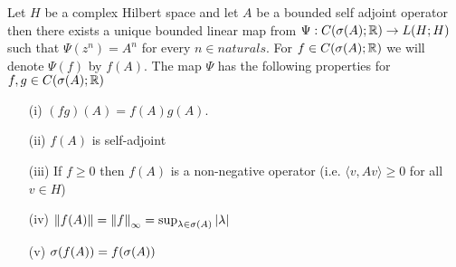 \begin{thm}\label{hilbert:ContinuousFunctionalCalculusBoundedSelfAdjoint}Let $H$ be a complex Hilbert space and let $A$ be a bounded self adjoint operator then there exists a unique bounded linear map from $\Psi : C(\sigma(A); \mathbb{R}) \to L(H;H)$ such that $\Psi(z^n) = A^n$ for every $n \in naturals$.  For $f \in  C(\sigma(A); \mathbb{R})$ we will denote $\Psi(f)$ by $f(A)$.  The map $\Psi$ has the following properties for $f,g  \in C(\sigma(A); \mathbb{R})$ 
\begin{itemize}
\item[(i)] $(fg)(A) = f(A) g(A)$.
\item[(ii)] $f(A)$ is self-adjoint
\item[(iii)] If $f \geq 0$ then $f(A)$ is a non-negative operator (i.e. $\langle v, Av \rangle \geq 0$ for all $v \in H$)
\item[(iv)] $\left \lVert f(A) \right \rVert = \left \lVert f \right \rVert_\infty = \sup_{\lambda \in \sigma(A)} \left \vert \lambda \right \vert$
\item[(v)] $\sigma(f(A)) = f(\sigma(A))$
\end{itemize}
\end{thm}
